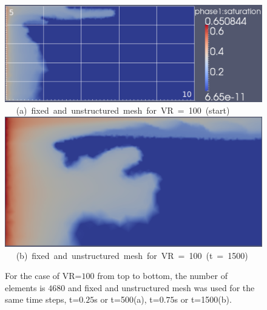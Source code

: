 \begin{landscape}
\begin{figure}[ht] 
\vbox{
\hbox{\hspace{3.5cm}
\includegraphics[width=.93\textwidth]{./Pics1/mr100_fixed/mr100_fixed_500.pdf} 
}
\vspace{0.0cm}
\hbox{\hspace{4.0cm} (a) fixed and unstructured mesh for VR = 100 (start)   
}
\hbox{\hspace{3.5cm}
\includegraphics[width=.7\textwidth]{./Pics1/mr100_fixed/mr100_fixed_1500.pdf}
}
\vspace{0.0cm}
\hbox{\hspace{3.75cm} (b) fixed and unstructured mesh for VR = 100 (t = 1500)   
}
}     
\caption{For the case of VR=$100$ from top to bottom, the number of elements is $4680$ and fixed and unstructured mesh was used for the same time steps, t=$0.25$s or t=500(a), t=$0.75$s or t=1500(b). }
\label{fig:4testcase_a}
\end{figure}
\end{landscape}
\clearpage

